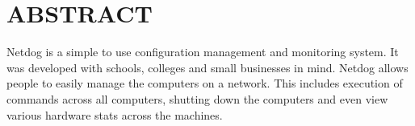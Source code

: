 \chapter*{\rm \large \bf ABSTRACT}
\vspace{4.0mm}
\setlength{\parindent}{4em}

\par
Netdog is a simple to use configuration management and monitoring system. It was
developed with schools, colleges and small businesses in mind. Netdog allows
people to easily manage the computers on a network. This includes execution of
commands across all computers, shutting down the computers and even view various
hardware stats across the machines.
\newpage 
